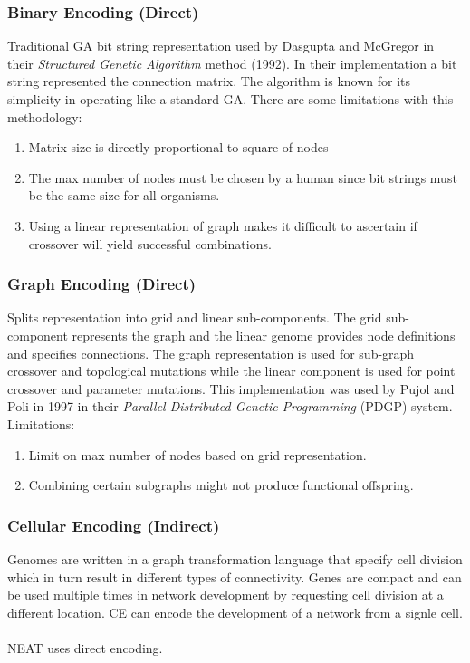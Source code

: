 \documentclass{article}
\begin{document}
\subsubsection*{Binary Encoding (Direct)}
Traditional GA bit string representation used by Dasgupta and McGregor in their \emph{Structured Genetic Algorithm} method (1992). In their implementation a bit string represented the connection matrix. The algorithm is known for its simplicity in operating like a standard GA.
There are some limitations with this methodology:
\begin{enumerate}
    \item Matrix size is directly proportional to square of nodes
    \item The max number of nodes must be chosen by a human since bit strings must be the same size for all organisms.
    \item Using a linear representation of graph makes it difficult to ascertain if crossover will yield successful combinations.
\end{enumerate}
\subsubsection*{Graph Encoding (Direct)}
Splits representation into grid and linear sub-components. The grid sub-component represents the graph and the linear genome provides node definitions and specifies connections.
The graph representation is used for sub-graph crossover and topological mutations while the linear component is used for point crossover and parameter mutations.
This implementation was used by Pujol and Poli in 1997 in their \emph{Parallel Distributed Genetic Programming} (PDGP) system.\\
Limitations:
\begin{enumerate}
    \item Limit on max number of nodes based on grid representation.
    \item Combining certain subgraphs might not produce functional offspring.
\end{enumerate}
\newpage
\subsubsection*{Cellular Encoding (Indirect)}
Genomes are written in a graph transformation language that specify cell division which in turn result in different types of connectivity. Genes are compact and can be used multiple times in network development by requesting cell division at a different location. CE can encode the development of a network from a signle cell.\\\\
NEAT uses direct encoding.
\end{document}
